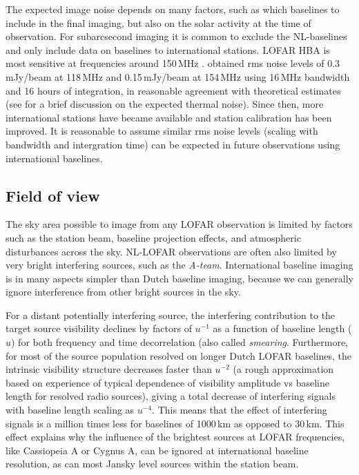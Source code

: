 \documentclass[graybox]{svmult}
\begin{document}
The expected image noise depends on many factors, such as which baselines to
include in the final imaging, but also on the solar activity at the time of
observation.  For subarcsecond imaging it is common to exclude the NL-baselines
and only include data on baselines to international stations.  LOFAR HBA is
most sensitive at frequencies around 150\,MHz \citep[Fig.  22]{vanhaarlem13}.
\cite{varenius15} obtained rms noise levels of 0.3\,mJy/beam at 118\,MHz and
0.15\,mJy/beam at 154\,MHz using 16\,MHz bandwidth and 16 hours of integration,
in reasonable agreement with theoretical estimates (see \cite{varenius15} for a
brief discussion on the expected thermal noise).  Since then, more
international stations have became available and station calibration has been
improved. It is reasonable to assume similar rms noise levels
(scaling with bandwidth and intergration time) can be expected in future
observations using international baselines.

\subsection{Field of view}
\label{sec:fov}
The sky area possible to image from any LOFAR observation is limited by factors
such as the station beam, baseline projection effects, and atmospheric
disturbances across the sky. NL-LOFAR observations are often also limited by
very bright interfering sources, such as the \emph{A-team}.  International
baseline imaging is in many aspects simpler than Dutch baseline imaging,
because we can generally ignore interference from other bright sources in the
sky.

For a distant potentially interfering source, the interfering contribution to
the target source visibility declines by factors of $u^{-1}$ as a function of
baseline length ($u$)  for both frequency and time decorrelation (also called
\emph{smearing}.  Furthermore, for  most  of the source population resolved on
longer Dutch LOFAR baselines, the intrinsic visibility structure decreases
faster than $u^{-2}$ (a rough approximation based on experience of typical
dependence of visibility amplitude vs baseline length for resolved radio
sources), giving a total decrease of interfering signals with baseline length
scaling as $ u^{-4}$. This means  that the effect of interfering signals is a
million times less for baselines of 1000\,km as opposed to 30\,km. This effect
explains why the influence of the brightest sources at LOFAR frequencies, like
Cassiopeia A or Cygnus A, can be ignored at international baseline resolution,
as can most Jansky level sources within the station beam.
\end{document}
